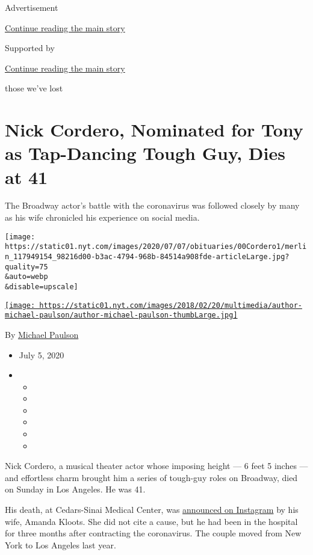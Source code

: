 Advertisement

\protect\hyperlink{after-top}{Continue reading the main story}

Supported by

\protect\hyperlink{after-sponsor}{Continue reading the main story}

those we've lost

\hypertarget{nick-cordero-nominated-for-tony-as-tap-dancing-tough-guy-dies-at-41}{%
\section{Nick Cordero, Nominated for Tony as Tap-Dancing Tough Guy, Dies
at
41}\label{nick-cordero-nominated-for-tony-as-tap-dancing-tough-guy-dies-at-41}}

The Broadway actor's battle with the coronavirus was followed closely by
many as his wife chronicled his experience on social media.

\texttt{[image: https://static01.nyt.com/images/2020/07/07/obituaries/00Cordero1/merlin\_117949154\_98216d00-b3ac-4794-968b-84514a908fde-articleLarge.jpg?quality=75\\\&auto=webp\\\&disable=upscale]}

\href{https://www.nytimes.com/by/michael-paulson}{\texttt{[image: https://static01.nyt.com/images/2018/02/20/multimedia/author-michael-paulson/author-michael-paulson-thumbLarge.jpg]}}

By \href{https://www.nytimes.com/by/michael-paulson}{Michael Paulson}

\begin{itemize}
\item
  July 5, 2020
\item
  \begin{itemize}
  \item
  \item
  \item
  \item
  \item
  \item
  \end{itemize}
\end{itemize}

Nick Cordero, a musical theater actor whose imposing height --- 6 feet 5
inches --- and effortless charm brought him a series of tough-guy roles
on Broadway, died on Sunday in Los Angeles. He was 41.

His death, at Cedars-Sinai Medical Center, was
\href{https://www.instagram.com/p/CCSBM89Axt_/}{announced on Instagram}
by his wife, Amanda Kloots. She did not cite a cause, but he had been in
the hospital for three months after contracting the coronavirus. The
couple moved from New York to Los Angeles last year.

